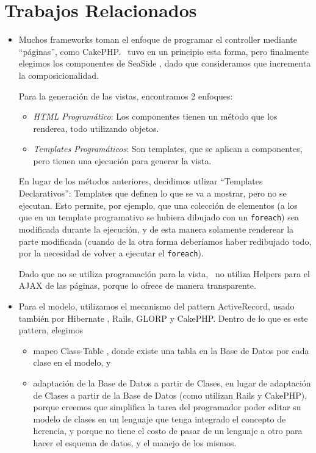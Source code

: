 \section{Trabajos Relacionados}

\begin{itemize}
\item Muchos frameworks toman el enfoque de programar el controller mediante ``páginas'', como CakePHP. \PWB \ tuvo en un principio esta forma, pero finalmente elegimos los componentes de SeaSide \cite{seaside}, dado que consideramos que incrementa la composicionalidad.


Para la generación de las vistas, encontramos 2 enfoques:
\begin{itemize}
\item \emph{HTML Programático}: Los componentes tienen un método que los renderea, todo utilizando objetos.
\item \emph{Templates Programáticos}: Son templates, que se aplican a componentes, pero tienen una ejecución para generar la vista.
\end{itemize}
En lugar de los métodos anteriores, decidimos utlizar ``Templates Declarativos'': Templates que definen lo que se va a mostrar, pero no se ejecutan. Esto permite, por ejemplo, que una colección de elementos (a los que en un template programativo se hubiera dibujado con un \verb"foreach") sea modificada durante la ejecución, y de esta manera solamente renderear la parte modificada (cuando de la otra forma deberíamos haber redibujado todo, por la necesidad de volver a ejecutar el \verb"foreach").

Dado que no se utiliza programación para la vista, \PWB \ no utiliza Helpers para el AJAX de las páginas, porque lo ofrece de manera transparente.

\item Para el modelo, utilizamos el mecanismo del pattern ActiveRecord, usado también por Hibernate \cite{hibernate}, Rails, GLORP y CakePHP. Dentro de lo que es este pattern, elegimos
\begin{itemize}
\item mapeo Class-Table \cite{classtable}, donde existe una tabla en la Base de Datos por cada clase en el modelo, y
\item adaptación de la Base de Datos a partir de Clases, en lugar de adaptación de Clases a partir de la Base de Datos (como utilizan Rails y CakePHP), porque creemos que simplifica la tarea del programador poder editar su modelo de clases en un lenguaje que tenga integrado el concepto de herencia, y porque no tiene el costo de pasar de un lenguaje a otro para hacer el esquema de datos, y el manejo de los mismos.
\end{itemize}


\end{itemize}
